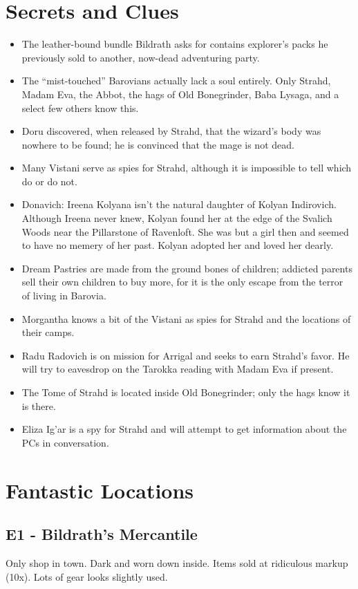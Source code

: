 \documentclass[a4paper,11pt]{article}
\begin{document}
\section{Secrets and Clues}
\label{sec:SecretsAndClues}
\begin{itemize}
  \item The leather-bound bundle Bildrath asks for contains explorer's packs he previously sold to another,
  now-dead adventuring party.
  \item The ``mist-touched'' Barovians actually lack a soul entirely. Only Strahd, Madam Eva, the Abbot, the hags
  of Old Bonegrinder, Baba Lysaga, and a select few others know this.
  \item Doru discovered, when released by Strahd, that the wizard's body was nowhere to be found; he is 
  convinced that the mage is not dead.
  \item Many Vistani serve as spies for Strahd, although it is impossible to tell which do or do not.
  \item Donavich: Ireena Kolyana isn't the natural daughter of Kolyan Indirovich. Although Ireena never knew, 
  Kolyan found her at the edge of the Svalich Woods near the Pillarstone of Ravenloft. She was but a girl then 
  and seemed to have no memery of her past. Kolyan adopted her and loved her dearly.
  \item Dream Pastries are made from the ground bones of children; addicted parents sell their own children to 
  buy more, for it is the only escape from the terror of living in Barovia.
  \item Morgantha knows a bit of the Vistani as spies for Strahd and the locations of their camps.
  \item Radu Radovich is on mission for Arrigal and seeks to earn Strahd's favor. He will try to eavesdrop on 
  the Tarokka reading with Madam Eva if present.
  \item The Tome of Strahd is located inside Old Bonegrinder; only the hags know it is there.
  \item Eliza Ig'ar is a spy for Strahd and will attempt to get information about the PCs in conversation.
\end{itemize}

\section{Fantastic Locations}
\label{sec:FantasticLocations}
\subsection{E1 - Bildrath's Mercantile}
  Only shop in town. Dark and worn down inside. Items sold at ridiculous markup (10x). Lots of gear looks 
  slightly used.
\end{document}
